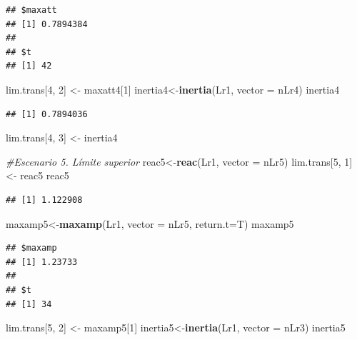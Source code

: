 \documentclass[
]{book}
\newenvironment{Shaded}{\begin{snugshade}}{\end{snugshade}}
\newcommand{\AttributeTok}[1]{\textcolor[rgb]{0.13,0.29,0.53}{#1}}
\newcommand{\CommentTok}[1]{\textcolor[rgb]{0.56,0.35,0.01}{\textit{#1}}}
\newcommand{\DecValTok}[1]{\textcolor[rgb]{0.00,0.00,0.81}{#1}}
\newcommand{\FunctionTok}[1]{\textcolor[rgb]{0.13,0.29,0.53}{\textbf{#1}}}
\newcommand{\NormalTok}[1]{#1}
\newcommand{\OtherTok}[1]{\textcolor[rgb]{0.56,0.35,0.01}{#1}}
\theoremstyle{definition}
\theoremstyle{definition}
\theoremstyle{definition}
\theoremstyle{definition}
\theoremstyle{remark}
\begin{document}
\begin{verbatim}
## $maxatt
## [1] 0.7894384
## 
## $t
## [1] 42
\end{verbatim}

\begin{Shaded}
\begin{Highlighting}[]
\NormalTok{lim.trans[}\DecValTok{4}\NormalTok{, }\DecValTok{2}\NormalTok{] }\OtherTok{\textless{}{-}}\NormalTok{ maxatt4[}\DecValTok{1}\NormalTok{]}
\NormalTok{inertia4}\OtherTok{\textless{}{-}}\FunctionTok{inertia}\NormalTok{(Lr1, }\AttributeTok{vector =}\NormalTok{ nLr4)}
\NormalTok{inertia4}
\end{Highlighting}
\end{Shaded}

\begin{verbatim}
## [1] 0.7894036
\end{verbatim}

\begin{Shaded}
\begin{Highlighting}[]
\NormalTok{lim.trans[}\DecValTok{4}\NormalTok{, }\DecValTok{3}\NormalTok{] }\OtherTok{\textless{}{-}}\NormalTok{ inertia4}

\CommentTok{\#Escenario 5. Límite superior}
\NormalTok{reac5}\OtherTok{\textless{}{-}}\FunctionTok{reac}\NormalTok{(Lr1, }\AttributeTok{vector =}\NormalTok{ nLr5)}
\NormalTok{lim.trans[}\DecValTok{5}\NormalTok{, }\DecValTok{1}\NormalTok{] }\OtherTok{\textless{}{-}}\NormalTok{ reac5}
\NormalTok{reac5}
\end{Highlighting}
\end{Shaded}

\begin{verbatim}
## [1] 1.122908
\end{verbatim}

\begin{Shaded}
\begin{Highlighting}[]
\NormalTok{maxamp5}\OtherTok{\textless{}{-}}\FunctionTok{maxamp}\NormalTok{(Lr1, }\AttributeTok{vector =}\NormalTok{ nLr5, }\AttributeTok{return.t=}\NormalTok{T)}
\NormalTok{maxamp5}
\end{Highlighting}
\end{Shaded}

\begin{verbatim}
## $maxamp
## [1] 1.23733
## 
## $t
## [1] 34
\end{verbatim}

\begin{Shaded}
\begin{Highlighting}[]
\NormalTok{lim.trans[}\DecValTok{5}\NormalTok{, }\DecValTok{2}\NormalTok{] }\OtherTok{\textless{}{-}}\NormalTok{ maxamp5[}\DecValTok{1}\NormalTok{]}
\NormalTok{inertia5}\OtherTok{\textless{}{-}}\FunctionTok{inertia}\NormalTok{(Lr1, }\AttributeTok{vector =}\NormalTok{ nLr3)}
\NormalTok{inertia5}
\end{Highlighting}
\end{Shaded}
\end{document}
